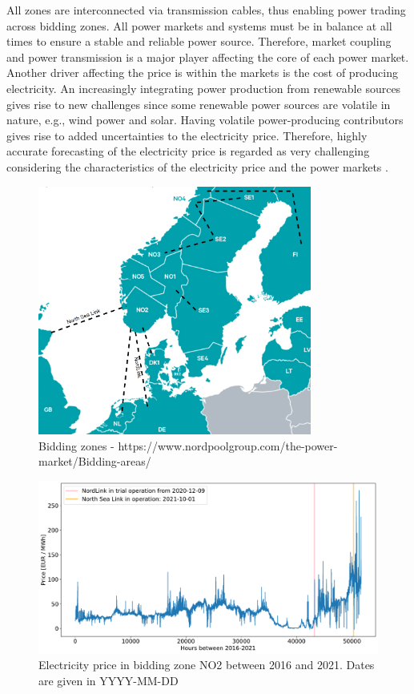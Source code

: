 \documentclass
[twocolumn,
secnumarabic,
nobibnotes,
aps,
prl,
reprint,
groupedaddress,
amsmath,
amssymb,
]{revtex4-2}
\begin{document}
All zones are interconnected via transmission cables, thus enabling power trading across bidding zones. All power markets and systems must be in balance at all times to ensure a stable and reliable power source. Therefore, market coupling and power transmission is a major player affecting the core of each power market. Another driver affecting the price is within the markets is the cost of producing electricity. An increasingly integrating power production from renewable sources gives rise to new challenges since some renewable power sources are volatile in nature, e.g., wind power and solar. Having volatile power-producing contributors gives rise to added uncertainties to the electricity price. Therefore, highly accurate forecasting of the electricity price is regarded as very challenging considering the characteristics of the electricity price and the power markets \cite{li_day-ahead_2021, nogales_forecasting_2002,bunn_forecasting_2000}. 


\begin{figure}[t]
  \centering
  \includegraphics[width=90mm,scale=1.0]{figures/bidding_zones_selfmaid.png}
  \caption{\label{fig:biddin_zones}Bidding zones - https://www.nordpoolgroup.com/the-power-market/Bidding-areas/}

\end{figure}


\begin{figure}%
\includegraphics[width=2.0\columnwidth]{figures/price_2016_2021.pdf}
\caption{\label{fig:NO2_price} Electricity price in bidding zone NO2 between 2016 and 2021. Dates are given in YYYY-MM-DD}
\end{figure}
\end{document}
